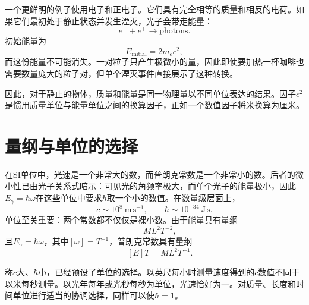 一个更鲜明的例子使用电子和正电子。它们具有完全相等的质量和相反的电荷。如果它们最初处于静止状态并发生湮灭，光子会带走能量：
\begin{equation}
e^-+e^+\longrightarrow \text{photons}.
\end{equation}
初始能量为
\begin{equation}
E_{\mathrm{initial}}=2m_e c^2,
\end{equation}
而这份能量不可能消失。一对粒子只产生极微小的量，因此即使要加热一杯咖啡也需要数量庞大的粒子对，但单个湮灭事件直接展示了这种转换。

因此，对于静止的物体，质量和能量是同一物理量以不同单位表达的结果。因子\(c^2\)是惯用质量单位与能量单位之间的换算因子，正如一个数值因子将米换算为厘米。

\begin{classroomqa}
\end{classroomqa}

\section{量纲与单位的选择}

在SI单位中，光速是一个非常大的数，而普朗克常数是一个非常小的数。后者的微小性已由光子关系式暗示：可见光的角频率极大，而单个光子的能量极小，因此\(E_\gamma=\hbar\omega\)在这些单位中要求\(\hbar\)取一个小的数值。在数量级层面上，
\begin{equation}
c\sim 10^8\ \mathrm{m\,s^{-1}},
\qquad
\hbar\sim 10^{-34}\ \mathrm{J\,s}.
\end{equation}
单位至关重要：两个常数都不仅仅是裸小数。由于能量具有量纲
\begin{equation}
[E]=M L^2 T^{-2},
\end{equation}
且\(E_\gamma=\hbar\omega\)，其中\([\omega]=T^{-1}\)，普朗克常数具有量纲
\begin{equation}
[\hbar]=[E]T=M L^2 T^{-1}.
\end{equation}

称\(c\)大、\(\hbar\)小，已经预设了单位的选择。以英尺每小时测量速度得到的\(c\)数值不同于以米每秒测量。以光年每年或光秒每秒为单位，光速恰好为一。对质量、长度和时间单位进行适当的协调选择，同样可以使\(\hbar=1\)。

